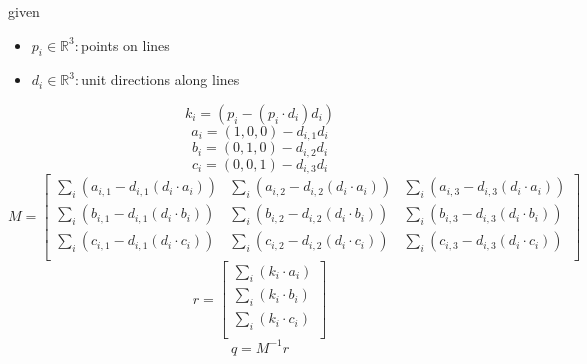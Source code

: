 \documentclass[12pt]{article}
\begin{document}
given
\begin{itemize}
\item $\textit{p}_{\textit{i}} \in \mathbb{R}^{ 3}:$points on lines
\item $\textit{d}_{\textit{i}} \in \mathbb{R}^{ 3}:$unit directions along lines
\end{itemize}

\[
\textit{k}_{ \textit{i} } = (\textit{p}_{ \textit{i} } - (\textit{p}_{ \textit{i} } \cdot \textit{d}_{ \textit{i} })\textit{d}_{ \textit{i} })
\]
\[
\textit{a}_{ \textit{i} } = (1,0,0) - \textit{d}_{ \textit{i}, 1 }\textit{d}_{ \textit{i} }
\]
\[
\textit{b}_{ \textit{i} } = (0,1,0) - \textit{d}_{ \textit{i}, 2 }\textit{d}_{ \textit{i} }
\]
\[
\textit{c}_{ \textit{i} } = (0,0,1) - \textit{d}_{ \textit{i}, 3 }\textit{d}_{ \textit{i} }
\]
\[
\textit{M} = \begin{bmatrix}
\sum_\textit{i} (\textit{a}_{ \textit{i}, 1 } - \textit{d}_{ \textit{i}, 1 }(\textit{d}_{ \textit{i} } \cdot \textit{a}_{ \textit{i} })) & \sum_\textit{i} (\textit{a}_{ \textit{i}, 2 } - \textit{d}_{ \textit{i}, 2 }(\textit{d}_{ \textit{i} } \cdot \textit{a}_{ \textit{i} })) & \sum_\textit{i} (\textit{a}_{ \textit{i}, 3 } - \textit{d}_{ \textit{i}, 3 }(\textit{d}_{ \textit{i} } \cdot \textit{a}_{ \textit{i} }))\\
\sum_\textit{i} (\textit{b}_{ \textit{i}, 1 } - \textit{d}_{ \textit{i}, 1 }(\textit{d}_{ \textit{i} } \cdot \textit{b}_{ \textit{i} })) & \sum_\textit{i} (\textit{b}_{ \textit{i}, 2 } - \textit{d}_{ \textit{i}, 2 }(\textit{d}_{ \textit{i} } \cdot \textit{b}_{ \textit{i} })) & \sum_\textit{i} (\textit{b}_{ \textit{i}, 3 } - \textit{d}_{ \textit{i}, 3 }(\textit{d}_{ \textit{i} } \cdot \textit{b}_{ \textit{i} }))\\
\sum_\textit{i} (\textit{c}_{ \textit{i}, 1 } - \textit{d}_{ \textit{i}, 1 }(\textit{d}_{ \textit{i} } \cdot \textit{c}_{ \textit{i} })) & \sum_\textit{i} (\textit{c}_{ \textit{i}, 2 } - \textit{d}_{ \textit{i}, 2 }(\textit{d}_{ \textit{i} } \cdot \textit{c}_{ \textit{i} })) & \sum_\textit{i} (\textit{c}_{ \textit{i}, 3 } - \textit{d}_{ \textit{i}, 3 }(\textit{d}_{ \textit{i} } \cdot \textit{c}_{ \textit{i} }))\\
\end{bmatrix}
\]
\[
\textit{r} = \begin{bmatrix}
\sum_\textit{i} (\textit{k}_{ \textit{i} } \cdot \textit{a}_{ \textit{i} })\\
\sum_\textit{i} (\textit{k}_{ \textit{i} } \cdot \textit{b}_{ \textit{i} })\\
\sum_\textit{i} (\textit{k}_{ \textit{i} } \cdot \textit{c}_{ \textit{i} })\\
\end{bmatrix}
\]
\[
\textit{q} = \textit{M}^{-1}\textit{r}
\]
\end{document}
